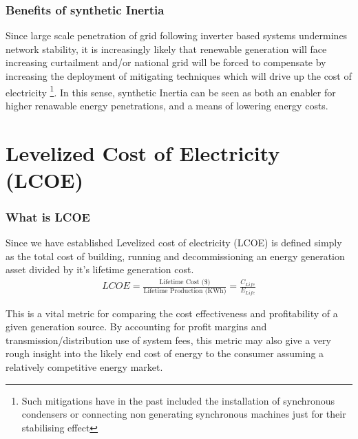 \documentclass[11pt]{article}
\numberwithin{equation}{section}
\begin{document}
\subsubsection{Benefits of synthetic Inertia}
\label{sec:org24671b9}
Since large scale penetration of grid following inverter based systems undermines network stability, it is increasingly likely that renewable generation will face increasing curtailment and/or national grid will be forced to compensate by increasing the deployment of mitigating techniques which will drive up the cost of electricity \footnote{Such mitigations have in the past included the installation of synchronous condensers or connecting non generating synchronous machines just for their stabilising effect}. In this sense, synthetic Inertia can be seen as both an enabler for higher renawable energy penetrations, and a means of lowering energy costs.

\section{Levelized Cost of Electricity (LCOE)}
\label{sec:orgecc1c46}
\subsubsection{What is LCOE}
\label{sec:orgdb15d9d}
Since we have established
Levelized cost of electricity (LCOE) is defined simply as the total cost of building, running and decommissioning an energy generation asset divided by it's lifetime generation cost.
\begin{align}
\label{eqLCOE}
LCOE = \frac{\text{Lifetime Cost (\$)}}{\text{Lifetime Production (KWh)}} = \frac{C_{Life}}{E_{Life}}
\end{align}

This is a vital metric for comparing the cost effectiveness and profitability of a given generation source. By accounting for profit margins and transmission/distribution use of system fees, this metric may also give a very rough insight into the likely end cost of energy to the consumer assuming a relatively competitive energy market.
\end{document}
